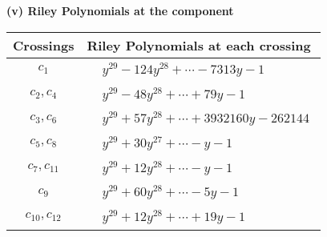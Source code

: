 \documentclass[1p]{elsarticle_modified}
\theoremstyle{definition}
\begin{document}
\flushleft \textbf{(v) Riley Polynomials at the component}\newline \\
\begin{tabular}{m{50pt}|m{274pt}}
Crossings & \hspace{64pt}Riley Polynomials at each crossing \\
\hline $$\begin{aligned}c_{1}\end{aligned}$$&$\begin{aligned}
&y^{29}-124 y^{28}+\cdots-7313 y-1
\end{aligned}$\\
\hline $$\begin{aligned}c_{2},c_{4}\end{aligned}$$&$\begin{aligned}
&y^{29}-48 y^{28}+\cdots+79 y-1
\end{aligned}$\\
\hline $$\begin{aligned}c_{3},c_{6}\end{aligned}$$&$\begin{aligned}
&y^{29}+57 y^{28}+\cdots+3932160 y-262144
\end{aligned}$\\
\hline $$\begin{aligned}c_{5},c_{8}\end{aligned}$$&$\begin{aligned}
&y^{29}+30 y^{27}+\cdots- y-1
\end{aligned}$\\
\hline $$\begin{aligned}c_{7},c_{11}\end{aligned}$$&$\begin{aligned}
&y^{29}+12 y^{28}+\cdots- y-1
\end{aligned}$\\
\hline $$\begin{aligned}c_{9}\end{aligned}$$&$\begin{aligned}
&y^{29}+60 y^{28}+\cdots-5 y-1
\end{aligned}$\\
\hline $$\begin{aligned}c_{10},c_{12}\end{aligned}$$&$\begin{aligned}
&y^{29}+12 y^{28}+\cdots+19 y-1
\end{aligned}$\\
\hline
\end{tabular}\\~\\
\end{document}
